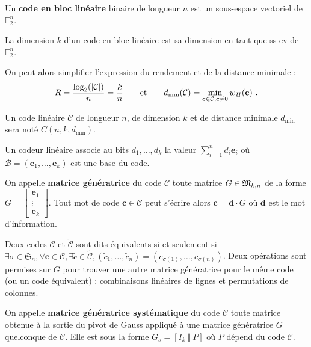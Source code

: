 	\begin{defn}
		Un \textbf{code en bloc linéaire} binaire de longueur $n$ est un sous-espace vectoriel de $\mathbb{F}_2^n$.
	\end{defn}

	\begin{defn}
		La dimension $k$ d'un code en bloc linéaire est sa dimension en tant que ss-ev de $\mathbb{F}_2^n$.
	\end{defn}

	On peut alors simplifier l'expression du rendement et de la distance minimale :
	$$R = \frac{\log_2(\left\lvert\mathcal{C}\right\rvert)}{n} = \frac{k}{n}
	\qquad \text{et} \qquad
	d_{\min}(\mathcal{C}) = \min_{\mathbf{c} \in \mathcal{C}, \mathbf{c} \neq 0} w_H(\mathbf{c})\ .$$

	\begin{note}
		Un code linéaire $\mathcal{C}$ de longueur $n$, de dimension $k$ et de distance minimale $d_{\min}$ sera noté $C(n,k,d_{\min})$.
	\end{note}

	\begin{defn}
		Un codeur linéaire associe au bits $d_1,\ldots,d_k$ la valeur $\sum_{i = 1}^n d_i \mathbf{e}_i$ où $\mathcal{B} = (\mathbf{e}_1,\ldots,\mathbf{e}_k)$ est une base du code.
	\end{defn}

	\begin{defn}
		On appelle \textbf{matrice génératrice} du code $\mathcal{C}$ toute matrice $G \in \mathfrak{M}_{k,n}$ de la forme
		$G = \begin{bmatrix}
			\mathbf{e}_1 \\ \vdots \\ \mathbf{e}_k
			\end{bmatrix}$.
		Tout mot de code $\mathbf{c} \in \mathcal{C}$ peut s'écrire alors $\mathbf{c} = \mathbf{d} \cdot G$ où $\mathbf{d}$ est le mot d'information.
	\end{defn}

	Deux codes $\mathcal{C}$ et $\mathcal{\tilde{C}}$ sont dits équivalents si et seulement si
	$\exists \sigma \in \mathfrak{S}_n,
		\forall \mathbf{c} \in \mathcal{C},
		\exists \mathcal{\tilde{c}} \in \mathcal{\tilde{C}},
		(\tilde{c}_1,\ldots,\tilde{c}_n) = (c_{\sigma(1)},\ldots,c_{\sigma(n)})$.
	Deux opérations sont permises sur $G$ pour trouver une autre matrice génératrice pour le même code (ou un code équivalent) : combinaisons linéaires de lignes et permutations de colonnes.

	\begin{defn}
		On appelle \textbf{matrice génératrice systématique} du code $\mathcal{C}$ toute matrice obtenue à la sortie du pivot de Gauss appliqué à une matrice génératrice $G$ quelconque de $\mathcal{C}$.
		Elle est sous la forme $G_s = [ I_k \ \Vert \ P]$ où $P$ dépend du code $\mathcal{C}$.
	\end{defn}

